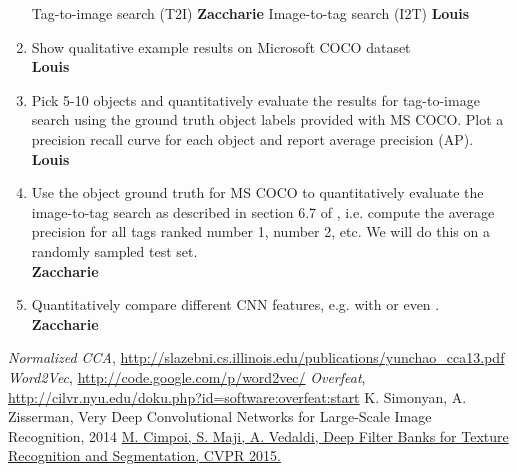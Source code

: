 \documentclass[a4paper,12pt]{article}
\begin{document}
\begin{enumerate}
    \subitem Tag-to-image search (T2I)
    \textbf{Zaccharie}
    \subitem Image-to-tag search (I2T)
    \textbf{Louis}
  \item Show qualitative example results on Microsoft COCO dataset
  \\\textbf{Louis}
  \item Pick 5-10 objects and quantitatively evaluate the results for tag-to-image search using the ground truth object labels provided with MS COCO. Plot a precision recall curve for each object and report average precision (AP).
  \\\textbf{Louis}
  \item Use the object ground truth for MS COCO to quantitatively evaluate the image-to-tag search as described in section 6.7 of \cite{normalizedcca}, i.e. compute the average precision for all tags ranked number 1, number 2, etc. We will do this on a randomly sampled test set.
  \\\textbf{Zaccharie}
  \item Quantitatively compare different CNN features, e.g. \cite{overfeat} with \cite{vgg} or even \cite{deepfilters}.
  \\\textbf{Zaccharie}

\end{enumerate}


\begin{thebibliography}{7}

  \emph{Normalized CCA},
  \url{http://slazebni.cs.illinois.edu/publications/yunchao_cca13.pdf}
  \emph{Word2Vec},
  \url{http://code.google.com/p/word2vec/}
  \emph{Overfeat},
  \url{http://cilvr.nyu.edu/doku.php?id=software:overfeat:start}
  \href{http://arxiv.org/pdf/1409.1556.pdf}{}{
  K. Simonyan, A. Zisserman, Very Deep Convolutional Networks for Large-Scale Image Recognition, 2014
  }
  \href{http://www.robots.ox.ac.uk/~vgg/publications/2015/Cimpoi15/cimpoi15.pdf}{
  M. Cimpoi, S. Maji, A. Vedaldi, Deep Filter Banks for Texture Recognition and Segmentation, CVPR 2015.
  }
\end{thebibliography}
\end{document}
